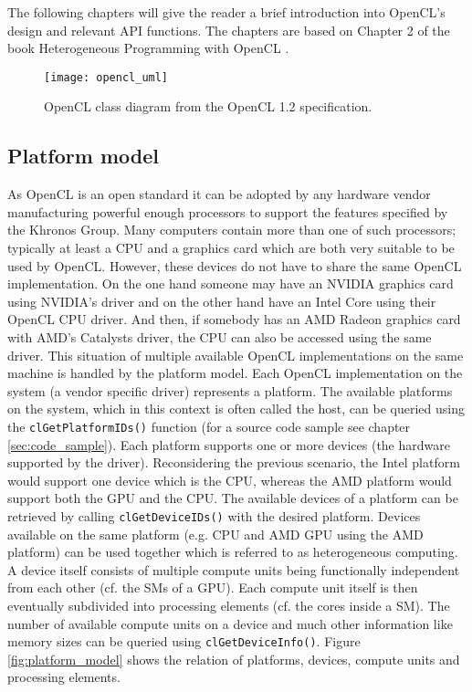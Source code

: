 The following chapters will give the reader a brief introduction into OpenCL's design and relevant API functions. The chapters are based on Chapter 2 of the book Heterogeneous Programming with OpenCL \cite[p.15-31]{opencl_book}.

\begin{figure}
\centering
\texttt{[image: opencl\_uml]}
\caption{OpenCL class diagram from the OpenCL 1.2 specification. \cite{opencl_spec}}
\label{fig:opencl_uml}
\end{figure}

\subsection{Platform model}
As OpenCL is an open standard it can be adopted by any hardware vendor manufacturing powerful enough processors to support the features specified by the Khronos Group. Many computers contain more than one of such processors; typically at least a CPU and a graphics card which are both very suitable to be used by OpenCL. However, these devices do not have to share the same OpenCL implementation. On the one hand someone may have an NVIDIA graphics card using NVIDIA's driver and on the other hand have an Intel Core using their OpenCL CPU driver. And then, if somebody has an AMD Radeon graphics card with AMD's Catalysts driver, the CPU can also be accessed using the same driver.
This situation of multiple available OpenCL implementations on the same machine is handled by the platform model. Each OpenCL implementation on the system (a vendor specific driver) represents a platform. The available platforms on the system, which in this context is often called the host, can be queried using the \lstinline!clGetPlatformIDs()! function (for a source code sample see chapter \ref{sec:code_sample}).
Each platform supports one or more devices (the hardware supported by the driver). Reconsidering the previous scenario, the Intel platform would support one device which is the CPU, whereas the AMD platform would support both the GPU and the CPU. The available devices of a platform can be retrieved by calling \lstinline!clGetDeviceIDs()! with the desired platform. Devices available on the same platform (e.g. CPU and AMD GPU using the AMD platform) can be used together which is referred to as heterogeneous computing. 
A device itself consists of multiple compute units being functionally independent from each other (cf. the SMs of a GPU). Each compute unit itself is then eventually subdivided into processing elements (cf. the cores inside a SM). The number of available compute units on a device and much other information like memory sizes can be queried using \lstinline!clGetDeviceInfo()!.
Figure \ref{fig:platform_model} shows the relation of platforms, devices, compute units and processing elements. \cite[p.19ff]{opencl_book}

